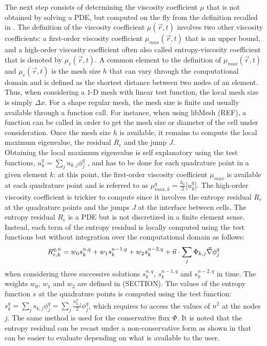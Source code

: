 The next step consists of determining the viscosity coefficient $\mu$ that is not obtained by solving a PDE, but computed on the fly from the definition recalled in . The definition of the viscosity coefficient $\mu(\vec{r},t)$ involves two other viscosity coefficients: a first-order viscosity coefficient $\mu_{max}(\vec{r},t)$ that is an upper bound, and a high-order viscosity coefficient often also called entropy-viscosity coefficient that is denoted by $\mu_e(\vec{r},t)$. A common element to the definition of $\mu_{max}(\vec{r},t)$ and $\mu_e(\vec{r},t)$ is the mesh size $h$ that can vary through the computational domain and is defined as the shortest distance between two nodes of an element. Thus, when considering a $1$-D mesh with linear test function, the local mesh size is simply $\Delta x$. For a shape regular mesh, the mesh size is finite and usually available through a function call. For instance, when using libMesh (REF), a function can be called in order to get the mesh size or diameter of the cell under consideration. Once the mesh size $h$ is available, it remains to compute the local maximum eigenvalue, the residual $R_e$ and the jump $J$. \\
Obtaining the local maximum eigenvalue is self explanatory using the test functions, $u^q_k = \sum_j u_{k,j} \phi^q_j$ , and has to be done for each quadrature point in a given element $k$: at this point, the first-order viscosity coefficient $\mu_{max}$ is available at each quadrature point and is referred to as $\mu_{max,k}^q = \frac{h_k}{2} | u^q_k |$. The high-order viscosity coefficient is trickier to compute since it involves the entropy residual $R_e$ at the quadrature points and the jumps $J$ at the interface between cells. The entropy residual $R_e$ is a PDE but is not discretized in a finite element sense. Instead, each term of the entropy residual is locally computed using the test functions but without integration over the computational domain as follows:
%
\begin{equation}\label{eq:res_disc_sct2}
R_{e,k}^{q,n} = w_0 s^{n,q}_k + w_1 s^{n-1,q}_k + w_2 s^{n-2,q}_k +  \vec{n} \cdot  \sum_j \Phi_{k,j}\vec{\nabla} \phi^q_j
\end{equation}
when considering three successive solutions $s^{n,q}_k$, $s^{n-1,q}_k$ and $s^{n-2,q}_k$ in time. The weights $w_0$, $w_1$ and $w_2$ are defined in (SECTION). The values of the entropy function $s$ at the quadrature points is computed using the test function: $s^q_k = \sum_j s_{k,j} \phi^q_j = \sum_j \frac{u_{k,j}^2}{2} \phi^q_j$, which requires to access the values of $u^2$ at the nodes $j$. The same method is used for the conservative flux $\Phi$. It is noted that the entropy residual can be recast under a non-conservative form as shown in  that can be easier to evaluate depending on what is available to the user.
